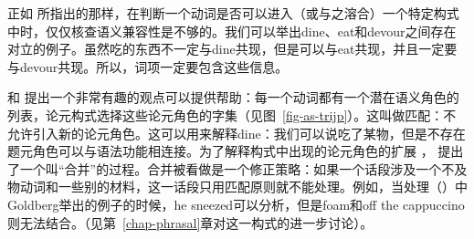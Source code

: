 正如 \citet[--90]{Dowty89b-u}所指出的那样，在判断一个动词是否可以进入（或与之溶合）一个特定构式中时，仅仅核查语义兼容性是不够的。我们可以举出dine、eat和devour之间存在对立的例子。虽然吃的东西不一定与dine共现，但是可以与eat共现，并且一定要与devour共现。所以，词项一定要包含这些信息。

和 \citet{SvT2011a} 提出一个非常有趣的观点可以提供帮助：每一个动词都有一个潜在语义角色的列表，论元构式选择这些论元角色的字集（见图~\ref{fig-as-trijp}）。这叫做匹配：不允许引入新的论元角色。这可以用来解释dine：我们可以说吃了某物，但是不存在题元角色可以与语法功能相连接。为了解释构式中出现的论元角色的扩展 \citep[\S~7]{Goldberg95a}， \citet{SvT2011a} 提出了一个叫“合并”的过程。合并被看做是一个修正策略：如果一个话段涉及一个不及物动词和一些别的材料，这一话段只用匹配原则就不能处理。例如，当处理（）中Goldberg举出的例子的时候，he sneezed可以分析，但是foam和off the cappuccino则无法结合。（见第~\ref{chap-phrasal}章对这一构式的进一步讨论）。
